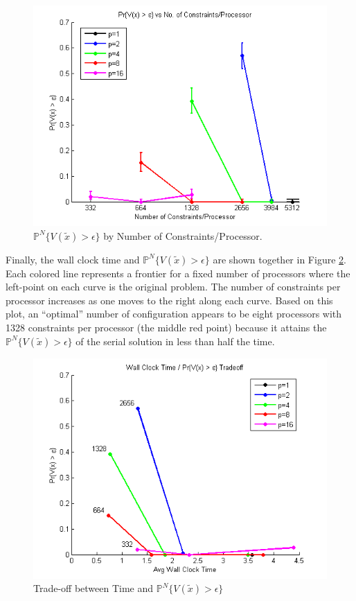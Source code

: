 \documentclass[12pt]{article}
\begin{document}
\begin{figure}[ht]
	\centering
		\includegraphics[scale=0.9]{../plot/figs/probviolprobgreateps_numconstraint.png}
	\caption{$\mathbb{P}^N\{V(\tilde{x}) > \epsilon \}$ by Number of Constraints/Processor.}
	\label{fig:probviolprobgreateps_numconstraint}
\end{figure}

Finally, the wall clock time and $\mathbb{P}^N\{V(\tilde{x}) > \epsilon \}$ are shown together in Figure \ref{fig:wct_probviolprobgreateps_frontier_constraint}.
Each colored line represents a frontier for a fixed number of processors where the left-point on each curve is the original problem.
The number of constraints per processor increases as one moves to the right along each curve.
Based on this plot, an ``optimal'' number of configuration appears to be eight processors with 1328 constraints per processor (the middle red point) because it attains the $\mathbb{P}^N\{V(\tilde{x}) > \epsilon \}$ of the serial solution in less than half the time.

\begin{figure}[ht]
	\centering
		\includegraphics[scale=0.9]{../plot/figs/wct_probviolprobgreateps_frontier_constraint.png}
	\caption{Trade-off between Time and $\mathbb{P}^N\{V(\tilde{x}) > \epsilon \}$}
	\label{fig:wct_probviolprobgreateps_frontier_constraint}
\end{figure}
\end{document}
